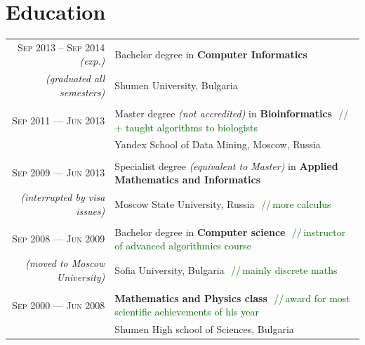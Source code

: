 \documentclass[a4paper,10pt]{article}
\def\myline{\color{linegray}\vline}
\newcommand{\minorcolor}[1]{\textcolor{mygray}{#1}}
\newcommand{\comment}[1]{\small\textcolor{darkgreen}{\,\,//\,#1}}
\newcommand{\mydate}[1]{\minorcolor{\textsc{#1}}}
\newcommand{\bracketcomment}[1]{{\small\textit{\minorcolor{(#1)}}}}
\begin{document}
\section{Education}
\hspace{-2mm}\begin{tabular}{r!{\myline}p{14cm}}
  \mydate{Sep 2013 -- Sep 2014} \bracketcomment{exp.}     &  Bachelor degree in \textbf{Computer Informatics}\\
\bracketcomment{graduated all semesters}  &  Shumen University, Bulgaria\\

        \\
        \mydate{Sep 2011 --- Jun 2013}      &   Master degree \bracketcomment{not accredited} in \textbf{Bioinformatics}
                                                \comment{+ taught algorithms to biologists}\\
	                                    &   Yandex School of Data Mining, Moscow, Russia\\
	
        \\
        \mydate{Sep 2009 --- Jun 2013}      &   Specialist degree \bracketcomment{equivalent to Master} in \textbf{Applied Mathematics and Informatics}\\
        \bracketcomment{interrupted by visa issues} & Moscow State University, Russia
                                                      \comment{more calculus}\\

	\\
        \mydate{Sep 2008 --- Jun 2009}      &   Bachelor degree in \textbf{Computer science}
                                                \comment{instructor of advanced algorithmics course}\\
        \bracketcomment{moved to Moscow University} &  Sofia University, Bulgaria \comment{mainly discrete maths}\\
	
	\\
        \mydate{Sep 2000 --- Jun 2008}      &   \textbf{Mathematics and Physics class}
                                                \comment{award for most scientific achievements of his year}\\
                                            &   Shumen High school of Sciences, Bulgaria\\
\end{tabular}
\par\smallskip
\end{document}
